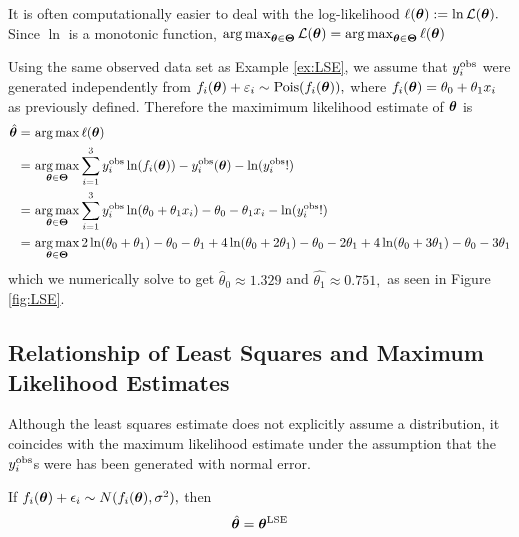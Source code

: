 It is often computationally easier to deal with the log-likelihood
$\ell(\bm{\theta}) := \ln\mathcal{L}(\bm{\theta}).$ Since $\ln$ is a monotonic function,
$\operatorname*{arg\,max}_{\bm{\theta}\in\mathbf{\Theta}} \mathcal{L}(\bm{\theta})
    = \operatorname*{arg\,max}_{\bm{\theta}\in\mathbf{\Theta}} \ell(\bm{\theta})$

\begin{example}
    Using the same observed data set as Example \ref{ex:LSE}, we assume that
    $y_i^{\mathrm{obs}}$ were generated independently from
    $f_i(\bm{\theta}) + \varepsilon_i \sim \operatorname{Pois}(f_i(\bm{\theta})),$ where
    $f_i(\bm{\theta}) = \theta_0 + \theta_1x_i$ as previously defined. Therefore
    the maximimum likelihood estimate of $\bm{\theta}$ is
    \begin{align*}
        \hat{\bm{\theta}}
        = & \, \operatorname*{arg\,max} \ell(\bm{\theta})                                  \\
        = & \, \operatorname*{arg\,max}_{\bm{\theta}\in\mathbf{\Theta}}\sum_{i = 1}^{3}
        y_i^{\mathrm{obs}}\ln(f_i(\bm{\theta})) -y_i^{\mathrm{obs}}(\bm{\theta}) - \ln(y_i^{\mathrm{obs}}!) \\
        = & \, \operatorname*{arg\,max}_{\bm{\theta}\in\mathbf{\Theta}}\sum_{i = 1}^{3}
        y_i^{\mathrm{obs}}\ln(\theta_0 + \theta_1x_i)
        - \theta_0 - \theta_1x_i
        - \ln(y_i^{\mathrm{obs}}!)                                              \\
        = & \, \operatorname*{arg\,max}_{\bm{\theta}\in\mathbf{\Theta}}
        2\ln(\theta_0 + \theta_1) - \theta_0 - \theta_1
        + 4\ln(\theta_0 + 2\theta_1) - \theta_0 - 2\theta_1
        + 4\ln(\theta_0 + 3\theta_1) - \theta_0 - 3\theta_1
    \end{align*}
    which we numerically solve to get $\hat{\theta}_0 \approx 1.329$
    and $\hat{\theta_1} \approx 0.751,$ as seen in Figure \ref{fig:LSE}.
\end{example}

\subsection*{Relationship of Least Squares and Maximum Likelihood Estimates}

Although the least squares estimate does not explicitly assume a distribution,
it coincides with the maximum likelihood estimate under the assumption that
the $y_i^{\mathrm{obs}}$s were has been generated with normal error.

\begin{theorem}
    If $f_i(\bm{\theta}) + \epsilon_i \sim N(f_i(\bm{\theta}), \sigma^2),$ then
    $$
        \hat{\bm{\theta}} = \bm{\theta}^{\mathrm{LSE}}
    $$
\end{theorem}

